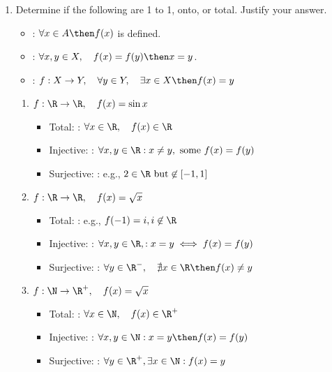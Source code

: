 \documentclass[basic, header]{nosvagor-notes}
\begin{document}
\begin{enumerate}[itemsep=5em]
  \item Determine if the following are 1 to 1, onto, or total. Justify your answer.

    \begin{itemize}
      \item {}: \(\forall x \in A \then f(x) \) is defined.

      \item {}:
        \(\forall x,y \in X, \quad f(x) = f(y) \then x = y\).

      \item {}:
         \(f : X \to Y, \quad \forall y \in Y, \quad \exists x
        \in X \then f(x) = y \)
    \end{itemize}

    \vspace{1em}

  \begin{enumerate}
    \item \(f : \R \to \R, \quad f(x) = \sin x\)
      \begin{itemize}
        \item Total: : \(\forall x \in \R, \quad  f(x) \in \R\)
        \item Injective: : \(\forall x, y \in \R : x \neq y, ~\text{some}~ f(x) = f(y)\)
        \item Surjective: : e.g., \( 2 \in \R ~\text{but}\not\in [-1,1]\)
      \end{itemize}

    \item \(f : \R \to \R, \quad f(x) = \sqrt{x}\)
      \begin{itemize}
        \item Total: : e.g., \(f(-1) = i, i \not\in \R\)
        \item Injective: : \(\forall x,y \in \R, : x = y \iff f(x) = f(y)\)
        \item Surjective: : \(\forall y \in \R^{-}, \quad \nexists x \in \R \then f(x) \neq y\)
      \end{itemize}

    \item \(f : \N \to \R^+, \quad f(x) = \sqrt{x}\)
      \begin{itemize}
        \item Total: : \(\forall x \in \N, \quad  f(x) \in \R^+ \)
        \item Injective: : \(\forall x, y \in \N : x = y \then f(x) = f(y)  \)
        \item Surjective: : \(\forall y \in \R^+, \exists x \in \N : f(x) = y\)
      \end{itemize}


\end{enumerate}
\end{enumerate}
\end{document}
